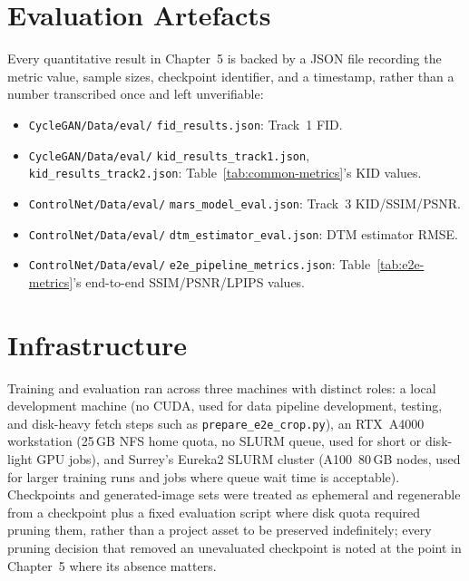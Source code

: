 \section{Evaluation Artefacts}
\label{sec:appendix-artefacts}

Every quantitative result in Chapter~5 is backed by a JSON file recording the metric value, sample sizes, checkpoint identifier, and a timestamp, rather than a number transcribed once and left unverifiable:

\begin{sloppypar}
\begin{itemize}
  \item \texttt{CycleGAN/Data/eval/} \texttt{fid\_results.json}: Track~1 FID.
  \item \texttt{CycleGAN/Data/eval/} \texttt{kid\_results\_track1.json}, \texttt{kid\_results\_track2.json}: Table~\ref{tab:common-metrics}'s KID values.
  \item \texttt{ControlNet/Data/eval/} \texttt{mars\_model\_eval.json}: Track~3 KID/SSIM/PSNR.
  \item \texttt{ControlNet/Data/eval/} \texttt{dtm\_estimator\_eval.json}: DTM estimator RMSE.
  \item \texttt{ControlNet/Data/eval/} \texttt{e2e\_pipeline\_metrics.json}: Table~\ref{tab:e2e-metrics}'s end-to-end SSIM/PSNR/LPIPS values.
\end{itemize}
\end{sloppypar}

\section{Infrastructure}
\label{sec:appendix-infra}

Training and evaluation ran across three machines with distinct roles: a local development machine (no CUDA, used for data pipeline development, testing, and disk-heavy fetch steps such as \texttt{prepare\_e2e\_crop.py}), an RTX~A4000 workstation (25\,GB NFS home quota, no SLURM queue, used for short or disk-light GPU jobs), and Surrey's Eureka2 SLURM cluster (A100~80\,GB nodes, used for larger training runs and jobs where queue wait time is acceptable). Checkpoints and generated-image sets were treated as ephemeral and regenerable from a checkpoint plus a fixed evaluation script where disk quota required pruning them, rather than a project asset to be preserved indefinitely; every pruning decision that removed an unevaluated checkpoint is noted at the point in Chapter~5 where its absence matters.
